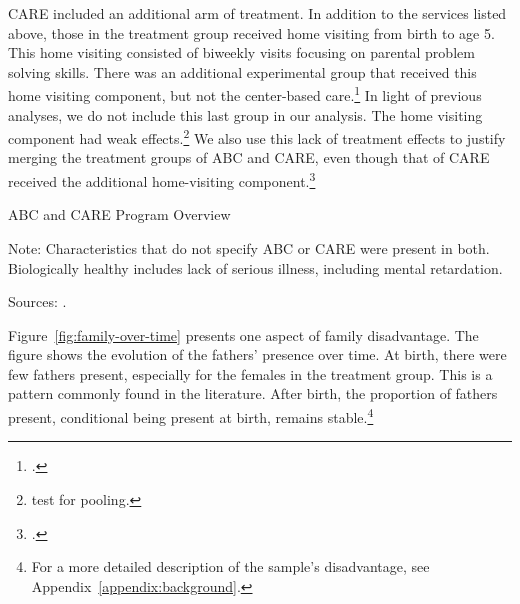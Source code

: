 CARE included an additional arm of treatment. In addition to the services listed above, those in the treatment group received home visiting from birth to age 5. This home visiting consisted of biweekly visits focusing on parental problem solving skills. There was an additional experimental group that received this home visiting component, but not the center-based care.\footnote{\citet{Wasik_Ramey_etal_1990_CD}.} In light of previous analyses, we do not include this last group in our analysis. The home visiting component had weak effects.\footnote{\citet{Campbell_Conti_etal_2014_EarlyChildhoodInvestments} test for pooling.} We also use this lack of treatment effects to justify merging the treatment groups of ABC and CARE, even though that of CARE received the additional home-visiting component.\footnote{\citet{ABCCARE_Dataset}.}

\begin{table}[H]
\centering
\caption{ABC and CARE Program Overview}
\label{tab:abc-care-characteristics}
\begin{threeparttable}
	
\begin{tablenotes}
\footnotesize
\item Note: Characteristics that do not specify ABC or CARE were present in both. Biologically healthy includes lack of serious illness, including mental retardation. \\
\item Sources: \citet{Ramey_Collier_etal_1976_CarolinaAbecedarianProject,Ramey_Smith_1977_AJMD,Ramey_etal_1985_Project-CARE_TiECSE,Wasik_Ramey_etal_1990_CD,Ramey_Campbell_1991_childreninpoverty}.
\end{tablenotes}
\end{threeparttable}
\end{table}

Figure~\ref{fig:family-over-time} presents one aspect of family disadvantage.  The figure shows the evolution of the fathers' presence over time. At birth, there were few fathers present, especially for the females in the treatment group. This is a pattern commonly found in the literature. After birth, the proportion of fathers present, conditional being present at birth, remains stable.\footnote{For a more detailed description of the sample's disadvantage, see Appendix~\ref{appendix:background}.}

